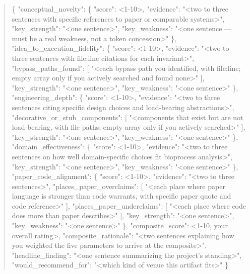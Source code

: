 \documentclass[11pt]{article}
\begin{document}
\begin{quote}
\{
  "conceptual\_novelty": \{
    "score": \textless{}1-10\textgreater{},
    "evidence": "\textless{}two to three sentences with specific references to paper or comparable systems\textgreater{}",
    "key\_strength": "\textless{}one sentence\textgreater{}",
    "key\_weakness": "\textless{}one sentence — must be a real weakness, not a token concession\textgreater{}"
  \},
  "idea\_to\_execution\_fidelity": \{
    "score": \textless{}1-10\textgreater{},
    "evidence": "\textless{}two to three sentences with file:line citations for each invariant\textgreater{}",
    "bypass\_paths\_found": [
      "\textless{}each bypass path you identified, with file:line; empty array only if you actively searched and found none\textgreater{}"
    ],
    "key\_strength": "\textless{}one sentence\textgreater{}",
    "key\_weakness": "\textless{}one sentence\textgreater{}"
  \},
  "engineering\_depth": \{
    "score": \textless{}1-10\textgreater{},
    "evidence": "\textless{}two to three sentences citing specific design choices and load-bearing abstractions\textgreater{}",
    "decorative\_or\_stub\_components": [
      "\textless{}components that exist but are not load-bearing, with file paths; empty array only if you actively searched\textgreater{}"
    ],
    "key\_strength": "\textless{}one sentence\textgreater{}",
    "key\_weakness": "\textless{}one sentence\textgreater{}"
  \},
  "domain\_effectiveness": \{
    "score": \textless{}1-10\textgreater{},
    "evidence": "\textless{}two to three sentences on how well domain-specific choices fit bioprocess analysis\textgreater{}",
    "key\_strength": "\textless{}one sentence\textgreater{}",
    "key\_weakness": "\textless{}one sentence\textgreater{}"
  \},
  "paper\_code\_alignment": \{
    "score": \textless{}1-10\textgreater{},
    "evidence": "\textless{}two to three sentences\textgreater{}",
    "places\_paper\_overclaims": [
      "\textless{}each place where paper language is stronger than code warrants, with specific paper quote and code reference\textgreater{}"
    ],
    "places\_paper\_underclaims": [
      "\textless{}each place where code does more than paper describes\textgreater{}"
    ],
    "key\_strength": "\textless{}one sentence\textgreater{}",
    "key\_weakness": "\textless{}one sentence\textgreater{}"
  \},
  "composite\_score": \textless{}1-10, your overall rating\textgreater{},
  "composite\_rationale": "\textless{}two sentences explaining how you weighted the five parameters to arrive at the composite\textgreater{}",
  "headline\_finding": "\textless{}one sentence summarizing the project's standing\textgreater{}",
  "would\_recommend\_for": "\textless{}which kind of venue this artifact fits\textgreater{}"
\}


\end{quote}
\end{document}
